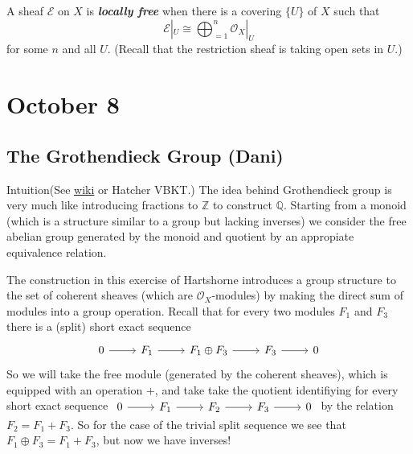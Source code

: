 \begin{defn}\leavevmode
	A sheaf $\mathcal{E}$ on $X$ is \textit{\textbf{locally free}} when there is a covering $\{U\}$ of $X$ such that
	\[\mathcal{E}|_{U}\cong \bigoplus_{=1}^n \mathcal{O}_X|_{U}\]
	for some $n$ and all $U$. (Recall that the restriction sheaf is taking open sets in $U$.)
\end{defn}


\section{October 8}

\subsection{The Grothendieck Group (Dani)}

\begin{thing4}{Intuition}(See \href{https://en.wikipedia.org/wiki/Grothendieck_group#Explicit_constructions}{wiki} or Hatcher  VBKT.)\hspace{.5em} The idea behind Grothendieck group is very much like introducing fractions to $\mathbb{Z}$ to construct $\mathbb{Q}$. Starting from a monoid (which is a structure similar to a group but lacking inverses) we consider the free abelian group generated by the monoid and quotient by an appropiate equivalence relation.

	The construction in this exercise of Hartshorne introduces a group structure to the set of coherent sheaves (which are $\mathcal{O}_X$-modules) by making the direct sum of modules into a group operation. Recall that for every two modules $F_1$ and $F_3$ there is a (split) short exact sequence 
	\[\begin{tikzcd}
		0\arrow[r]&F_1\arrow[r]&F_1\oplus F_3\arrow[r]&F_3\arrow[r]&0
	\end{tikzcd}\]
	So we will take the free module (generated by the coherent sheaves), which is equipped with an operation $+$, and take take the quotient identifiying for every short exact sequence  $\begin{tikzcd}
		0\arrow[r]&F_1\arrow[r]&F_2\arrow[r]&F_3\arrow[r]&0
	\end{tikzcd}$ by the relation $F_2=F_1 + F_3$. So for the case of the trivial split sequence we see that $F_1\oplus F_3=F_1+F_3$, but now we have inverses!
\end{thing4}

